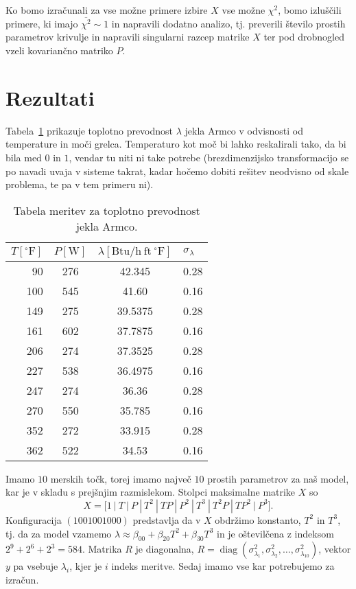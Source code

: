 \documentclass[a4 paper, 12pt]{article}
\newcommand{\diag}{
	\operatorname{diag}
}
\begin{document}
Ko bomo izra\v cunali za vse mo\v zne primere izbire $X$ vse mo\v zne $\chi^2$, bomo izlu\v s\v cili primere, ki imajo
$\overline{\chi^2} \sim 1$ in napravili dodatno analizo, tj. preverili \v stevilo prostih parametrov krivulje in
napravili singularni razcep matrike $X$ ter pod drobnogled vzeli kovarian\v cno matriko $P$.

\section{Rezultati}

Tabela~\ref{tab1} prikazuje toplotno prevodnost $\lambda$ jekla Armco v odvisnosti od temperature in mo\v ci grelca.
Temperaturo kot mo\v c bi lahko reskalirali tako, da bi bila med $0$ in $1$, vendar tu niti ni take potrebe
(brezdimenzijsko transformacijo se po navadi uvaja v sisteme takrat, kadar ho\v cemo dobiti re\v sitev neodvisno od
skale problema, te pa v tem primeru ni).

\begin{table}[H]\centering
	\caption{Tabela meritev za toplotno prevodnost jekla Armco.}
	\begin{tabular}{r|c|c|l}
		$T [^\circ\mathrm{F}]$ & $P[\mathrm{W}]$ & $\lambda[\mathrm{Btu/h\ ft\ {}^\circ F}]$ & $\sigma_{\lambda}$ \\
		\hline
		90  & 276 & 42.345  & 0.28 \\
		100 & 545 & 41.60   & 0.16 \\
		149 & 275 & 39.5375 & 0.28 \\
		161 & 602 & 37.7875 & 0.16 \\
		206 & 274 & 37.3525 & 0.28 \\
		227 & 538 & 36.4975 & 0.16 \\
		247 & 274 & 36.36   & 0.28 \\
		270 & 550 & 35.785  & 0.16 \\
		352 & 272 & 33.915  & 0.28 \\
		362 & 522 & 34.53   & 0.16
	\end{tabular}
	\label{tab1}
\end{table}

Imamo $10$ merskih to\v ck, torej imamo najve\v c $10$ prostih parametrov za na\v s model, kar je v skladu s prej\v snjim
razmislekom. Stolpci maksimalne matrike $X$ so
\[
	X = \Big[1\ |\ T\ |\ P\ |\ T^2\ |\ TP\ |\ P^2\ |\ T^3\ |\ T^2P\ |\ TP^2\ |\ P^3 \Big].
\]
Konfiguracija $(1001001000)$ predstavlja da v $X$ obdr\v zimo konstanto, $T^2$ in $T^3$, tj. da za model vzamemo
$\lambda \approx \beta_{00} + \beta_{20} T^2 + \beta_{30} T^3$ in je o\v stevil\v cena z indeksom $2^9 + 2^6 + 2^3 = 584$.
Matrika $R$ je diagonalna, $R = \diag(\sigma_{\lambda_1}^2, \sigma_{\lambda_2}^2, \ldots, \sigma_{\lambda_{10}}^2)$,
vektor $y$ pa vsebuje $\lambda_i$, kjer je $i$ indeks meritve. Sedaj imamo vse kar potrebujemo za izra\v cun.
\end{document}
